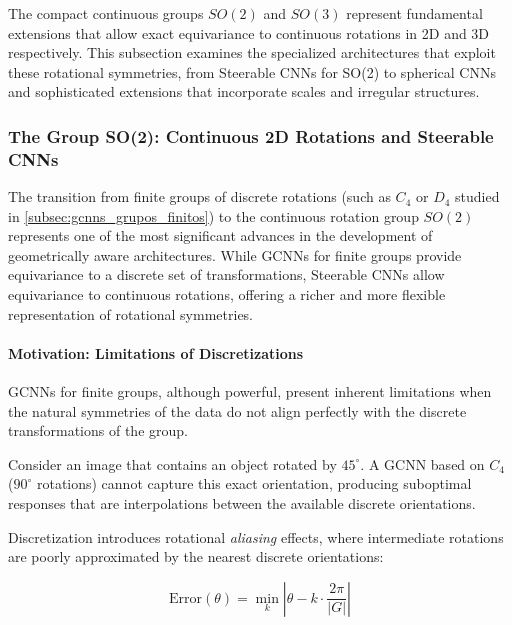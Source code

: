 The compact continuous groups $SO(2)$ and $SO(3)$ represent fundamental extensions that allow exact equivariance to continuous rotations in 2D and 3D respectively. This subsection examines the specialized architectures that exploit these rotational symmetries, from Steerable CNNs for SO(2) to spherical CNNs and sophisticated extensions that incorporate scales and irregular structures.

\subsubsection{The Group SO(2): Continuous 2D Rotations and Steerable CNNs}\label{subsubsec:steerable_cnns_so2}

The transition from finite groups of discrete rotations (such as $C_4$ or $D_4$ studied in \autoref{subsec:gcnns_grupos_finitos}) to the continuous rotation group $SO(2)$ represents one of the most significant advances in the development of geometrically aware architectures. While \glspl{GCNN} for finite groups provide equivariance to a discrete set of transformations, Steerable CNNs allow equivariance to continuous rotations, offering a richer and more flexible representation of rotational symmetries.

\paragraph{Motivation: Limitations of Discretizations}

\glspl{GCNN} for finite groups, although powerful, present inherent limitations when the natural symmetries of the data do not align perfectly with the discrete transformations of the group.

\begin{example}
Consider an image that contains an object rotated by $45^{\circ}$. A \gls{GCNN} based on $C_4$ ($90^{\circ}$ rotations) cannot capture this exact orientation, producing suboptimal responses that are interpolations between the available discrete orientations.
\end{example}

Discretization introduces rotational \textit{aliasing} effects, where intermediate rotations are poorly approximated by the nearest discrete orientations:

\begin{equation}
\text{Error}(\theta) = \min_{k} |\theta - k \cdot \frac{2\pi}{|G|}|
\end{equation}

